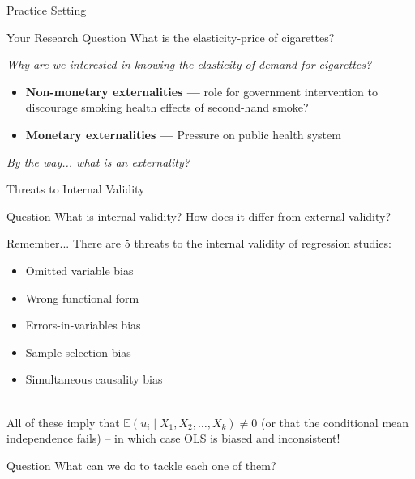 \documentclass[notes,10pt, aspectratio=169]{beamer}
\begin{document}
\begin{frame}{Practice Setting}
\begin{block}{Your Research Question}
    What is the elasticity-price of cigarettes?
\end{block}\vspace{.5cm}
\textit{Why are we interested in knowing the elasticity of demand for cigarettes?}\\[1em]

\begin{itemize}
    \item \textbf{Non-monetary externalities ---} role for government intervention to discourage smoking health effects of second-hand smoke? \\[1em]
    \item \textbf{Monetary externalities ---} Pressure on public health system
\end{itemize}
\vfill
\textit{By the way... what is an externality?}

\end{frame}


\begin{frame}{Threats to Internal Validity}

\begin{exampleblock}{Question}
    What is internal validity? How does it differ from external validity?
\end{exampleblock}

Remember... There are 5 threats to the internal validity of regression studies:
\begin{itemize}
    \item Omitted variable bias
    \item Wrong functional form
    \item Errors-in-variables bias
    \item Sample selection bias
    \item Simultaneous causality bias
\end{itemize}\\[1em]
All of these imply that $\mathbb{E}(u_i\mid X_1, X_2, \dots, X_k)\neq 0$ (or that the conditional mean independence fails) -- in which case OLS is biased and inconsistent!


\begin{exampleblock}{Question}
    What can we do to tackle each one of them?
\end{exampleblock}

\end{frame}
\end{document}
